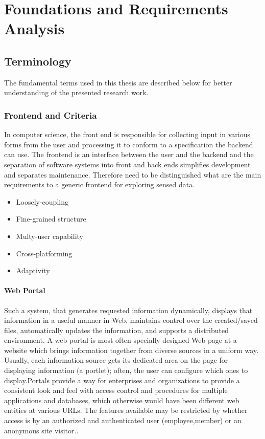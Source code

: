 \chapter{Foundations and Requirements Analysis}

\section{Terminology}
The fundamental terms used in this thesis are described below for better understanding of the presented research work.
\subsection {Frontend and Criteria}
In computer science, the front end is responsible for collecting input in various forms from the user and processing it to conform to a specification the backend can use. The frontend is an interface between the user and the backend \cite{wiki:xxx} and the separation of software systems into front and back ends simplifies development and separates maintenance. Therefore need to be distinguished what are the main requirements to a generic frontend for exploring sensed data.
\begin{itemize}
\item Loosely-coupling
\item Fine-grained structure
\item Multy-user capability
\item Cross-platforming
\item Adaptivity
\end{itemize}

\subsubsection {Web Portal}
Such a system, that generates requested information dynamically, displays that
information in a useful manner in Web, maintains control over the created/saved files, automatically updates
the information, and supports a distributed environment\cite{rezayat2000enterprise}.
A web portal is most often specially-designed Web page at a website which brings information together from diverse sources in a uniform way. Usually, each information source gets its dedicated area on the page for displaying information (a portlet); often, the user can configure which ones to display.Portals provide a way for enterprises and organizations to provide a consistent look and feel with access control and procedures for multiple applications and databases, which otherwise would have been different web entities at various URLs. The features available may be restricted by whether access is by an authorized and authenticated user (employee,member) or an anonymous site visitor.\cite{wiki:portal}.

